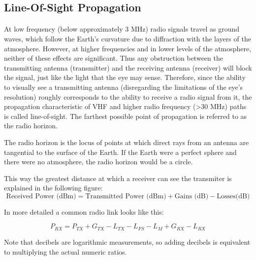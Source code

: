 \subsection*{Line-Of-Sight Propagation}
\paragraph{}
At low frequency (below approximately 3 MHz) radio signals travel as ground waves, which follow the Earth's curvature due to diffraction with the layers of the atmosphere.
However, at higher frequencies and in lower levels of the atmosphere, neither of these effects are significant. Thus any obstruction between the transmitting antenna (transmitter) and the receiving antenna (receiver) will block the signal, just like the light that the eye may sense. Therefore, since the ability to visually see a transmitting antenna (disregarding the limitations of the eye's resolution) roughly corresponds to the ability to receive a radio signal from it, the propagation characteristic of VHF and higher radio frequency (>30 MHz) paths is called line-of-sight. The farthest possible point of propagation is referred to as the radio horizon.

The radio horizon is the locus of points at which direct rays from an antenna are tangential to the surface of the Earth. If the Earth were a perfect sphere and there were no atmosphere, the radio horizon would be a circle.

This way the greatest distance at which a receiver can see the transmiter is explained in the following figure:
\begin{equation*}\label{eq:link_budget} 
 		\text{Received Power (dBm)} = \text{Transmitted Power (dBm)} + \text{Gains (dB)} - \text{Losses(dB)}
\end{equation*}

In more detailed a common radio link looks like this:

\begin{equation*}\label{eq:link_budget} 
 		P_{RX} = P_{TX} + G_{TX} - L_{TX} - L_{FS} - L_{M} + G_{RX} - L_{RX}
\end{equation*}

Note that decibels are logarithmic measurements, so adding decibels is equivalent to multiplying the actual numeric ratios.